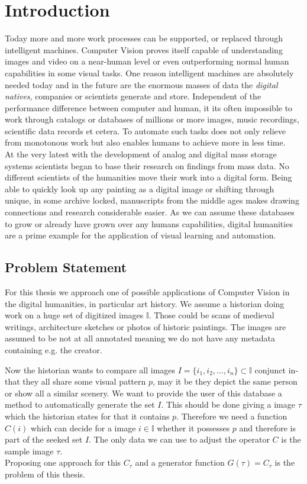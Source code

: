 %
\chapter{Introduction}
\label{sec:intro}
Today more and more work processes can be supported, or replaced through intelligent machines. Computer Vision proves itself capable of understanding images and video on a near-human level or even outperforming normal human capabilities in some visual tasks. One reason intelligent machines are absolutely needed today and in the future are the enormous masses of data the \textit{digital natives}, companies or scientists generate and store. Independent of the performance difference between computer and human, it its often impossible to work through catalogs or databases of millions or more images, music recordings, scientific data records et cetera. To automate such tasks does not only relieve from monotonous work but also enables humans to achieve more in less time.\\
At the very latest with the development of analog and digital mass storage systems scientists began to base their research on findings from mass data. No different scientists of the humanities move their work into a digital form. Being able to quickly look up any painting as a digital image or shifting through unique, in some archive locked, manuscripts from the middle ages makes drawing connections and research considerable easier. As we can assume these databases to grow or already have grown over any humans capabilities, digital humanities are a prime example for the application of visual learning and automation.

\section{Problem Statement}
\label{sec:intro:motivation}
For this thesis we approach one of possible applications of Computer Vision in the digital humanities, in particular art history. We assume a historian doing work on a huge set of digitized images $\mathbb{I}$. Those could be scans of medieval writings, architecture sketches or photos of historic paintings. The images are assumed to be not at all annotated meaning we do not have any metadata containing e.g. the creator.

Now the historian wants to compare all images $I = \{i_1, i_2,\dotsc,i_n\} \subset \mathbb{I}$ conjunct in-that they all share some visual pattern $p$, may it be they depict the same person or show all a similar scenery. We want to provide the user of this database a method to automatically generate the set $I$. This should be done giving a image $\tau$ which the historian states for that it contains $p$. Therefore we need a function $C(i)$ which can decide for a image $i\in\mathbb{I}$ whether it possesses $p$ and therefore is part of the seeked set $I$. The only data we can use to adjust the operator $C$ is the sample image $\tau$.\\Proposing one approach for this $C_\tau$ and a generator function $G(\tau) = C_\tau$ is the problem of this thesis.

